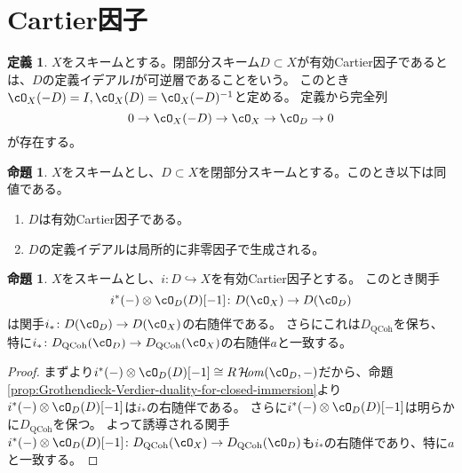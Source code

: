 \documentclass[uplatex, a4paper, dvipdfmx]{jsarticle}
\theoremstyle{definition}
\newtheorem{definition}[theorem]{定義}
\newtheorem{proposition}[theorem]{命題}
\DeclareMathOperator{\CHom}{\mathcal{H}\!\mathit{om}}
\DeclareMathOperator{\QCoh}{\mathrm{QCoh}}
\begin{document}
\section{Cartier因子}
\begin{definition}
    $X$をスキームとする。閉部分スキーム$D \subset X$が有効Cartier因子であるとは、$D$の定義イデアル$I$が可逆層であることをいう。
    このとき$\cO_X(-D) = I, \cO_X(D) = \cO_X(-D)^{-1}$と定める。
    定義から完全列
    \begin{equation}
        0 \to \cO_X(-D) \to \cO_X \to \cO_D \to 0
    \end{equation}
    が存在する。

\end{definition}
\begin{proposition}
    $X$をスキームとし、$D \subset X$を閉部分スキームとする。このとき以下は同値である。
    \begin{enumerate}
        \item $D$は有効Cartier因子である。
        \item $D$の定義イデアルは局所的に非零因子で生成される。
    \end{enumerate}
\end{proposition}
\begin{proposition}\label{prop:duality-for-Cartier-divisor}
    $X$をスキームとし、$i \colon D\hookrightarrow X$を有効Cartier因子とする。
    このとき関手
    \begin{equation}
        i^*(-)\otimes \cO_D(D)[-1] \colon D(\cO_X) \to D(\cO_D)
    \end{equation}
    は関手$i_* \colon D(\cO_D) \to D(\cO_X)$の右随伴である。
    さらにこれは$D_{\QCoh}$を保ち、
    特に$i_* \colon D_{\QCoh}(\cO_D) \to D_{\QCoh}(\cO_X)$の右随伴$a$と一致する。
\end{proposition}
\begin{proof}
    まず{\cite[\href{https://stacks.math.columbia.edu/tag/0AA4}{Tag 0AA4}]{stacks-project}}より$i^*(-)\otimes \cO_D(D)[-1] \cong R\CHom(\cO_D, -)$だから、命題\ref{prop:Grothendieck-Verdier-duality-for-closed-immersion}より$i^*(-)\otimes \cO_D(D)[-1]$は$i_*$の右随伴である。
    さらに$i^*(-)\otimes \cO_D(D)[-1]$は明らかに$D_{\QCoh}$を保つ。
    よって誘導される関手$i^*(-)\otimes \cO_D(D)[-1] \colon D_{\QCoh}(\cO_X) \to D_{\QCoh}(\cO_D)$も$i_*$の右随伴であり、特に$a$と一致する。
\end{proof}
\end{document}
